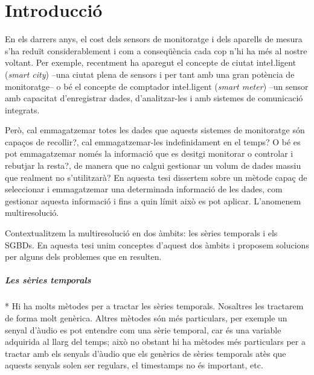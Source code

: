 

\chapter{Introducció}

En els darrers anys, el cost dels sensors de monitoratge i dels
aparells de mesura s'ha reduït considerablement i com a conseqüència
cada cop n'hi ha més al nostre voltant.  Per exemple, recentment ha
aparegut el concepte de ciutat inte\l.ligent (\emph{smart city}) --una
ciutat plena de sensors i per tant amb una gran potència de
monitoratge-- o bé el concepte de comptador inte\l.ligent (\emph{smart
  meter}) --un sensor amb capacitat d'enregistrar dades,
d'analitzar-les i amb sistemes de comunicació integrats.  

Però, cal emmagatzemar totes les dades que aquests sistemes de
monitoratge són capaços de recollir?, cal emmagatzemar-les
indefinidament en el temps? O bé es pot emmagatzemar només la
informació que es desitgi monitorar o controlar i rebutjar la resta?,
de manera que no calgui gestionar un volum de dades massiu que
realment no s'utilitzarà? En aquesta tesi dissertem sobre un mètode
capaç de seleccionar i emmagatzemar una determinada informació de les
dades, com gestionar aquesta informació i fins a quin límit això es pot
aplicar. L'anomenem multiresolució.


Contextualitzem la multiresolució en dos àmbits: les sèries temporals
i els \glspl{SGBD}. En aquesta tesi unim conceptes d'aquest dos àmbits
i proposem solucions per alguns dels problemes que en resulten.



\paragraph{Les sèries temporals}




* Hi ha molts mètodes per a tractar les sèries temporals. Nosaltres les tractarem de forma molt genèrica. Altres mètodes són més particulars, per exemple un senyal d'àudio es pot entendre com una sèrie temporal, car és una variable adquirida al llarg del temps; això no obstant hi ha mètodes més particulars per a tractar amb els senyals d'àudio que els genèrics de sèries temporals atès que aquests senyals solen ser regulars, el timestamps no és important, etc.

